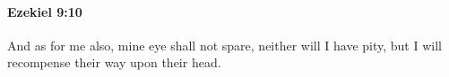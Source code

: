 
		\paragraph{Ezekiel 9:10} %
			\label{EZEKIEL-9-10}

			And as for me also, mine eye shall not spare, neither will I have pity, but I will recompense their way upon their head.


